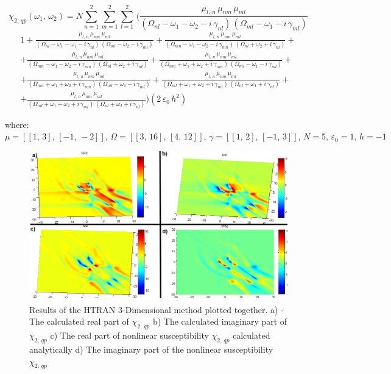 \documentclass[12pt,twoside,a4paper]{article}
\numberwithin{equation}{subsection}
\numberwithin{figure}{subsection}
\begin{document}
\begin{equation}
  {\chi_{2, \,qp}}({\omega_{1}}, \,{\omega_{2}})=N \sum_{n=1}^{2} \sum_{m=1}^{2} \sum_{l=1}^{2}\,(
    \frac {{\mu_{l, \,n}}\,{\mu_{ nm}}\,{\mu_{ml}}}
      {({\Omega_{nl}} - \omega_1 - \omega_2 - i\,{\gamma_{nl}})\,({\Omega_{ml}} - \omega_1 - i\,{\gamma_{ml}})}
\end{equation}
\begin{alignat*}{1} 
  + \frac {{\mu_{l, \,n}}\,{\mu_{nm}}\,{\mu_{ml}}}
      {({\Omega_{nl}} - \omega_1 - \omega_1 - i\,{\gamma_{nl}})\,({\Omega_{ml}} - \omega_2 - i\,{\gamma_{ml}})} 
  + \frac {{\mu_{l, \,n}}\,{\mu_{nm}} \,{\mu_{ml}}}
      {({\Omega_{mn}} - \omega_1 - \omega_2 - i\,{\gamma_{mn}})\,({\Omega_{nl}} + \omega_2 + i\,{\gamma_{nl}})} 
+\\ + \frac {{\mu_{l, \,n}}\,{\mu_{nm}}\,{\mu_{ml}}}
      {({\Omega_{mn}} - \omega_1 - \omega_2 - i\,{\gamma_{mn}})\,({\Omega_{nl}} + \omega_2 + i\,{\gamma_{nl}})} 
  + \frac {{\mu_{l, \,n}}\,{\mu_{nm}}\,{\mu_{ml}}}
      {({\Omega_{nm}} + \omega_1 + \omega_2 + i\,{\gamma_{nm}})\,({\Omega_{ml}} - \omega_1 - i\,{\gamma_{ml}})} 
+\\ + \frac {{\mu_{l, \,n}}\,{\mu_{nm}}\,{\mu_{ml}}}
      {({\Omega_{nm}} + \omega_1 + \omega_2 + i\,{\gamma_{nm}})\,({\Omega_{ml}} - \omega_1 - i\,{\gamma_{ml}})} 
  + \frac {{\mu_{l, \,n}}\,{\mu_{nm}}\,{\mu_{ml}}}
      {({\Omega_{ml}} + \omega_1 + \omega_2 + i\,{\gamma_{ml}})\,({\Omega_{nl}} + \omega_1 + i\,{\gamma_{nl}})} 
+\\ + \frac {{\mu_{l, \,n}}\,{\mu_{nm}}\,{\mu_{ml}}}
      {({\Omega_{ml}} + \omega_1 + \omega_2 + i\,{\gamma_{ml}})\,({\Omega_{nl}} + \omega_2 + i\,{\gamma_{nl}})})  
      (2\,{ \varepsilon_{0}}\,h^{2})
\end{alignat*}

where: 
$\mu=[[1,\,3],\,[-1,\,-2]],\,\Omega=[[3,\,16],\,[4,\,12]],\,\gamma=[[1,\,2],\,[-1,\,3]],\,N=5,\,\varepsilon_{0}=1,\,h=-1$

 

\begin{figure}
  \includegraphics[width=150mm]{img/htran_qp_3d.png}
  \caption{Results of the HTRAN 3-Dimensional method plotted together.  
     a) - The calculated real part of ${\chi_{2, \,qp}}$ 
     b) The calculated imaginary part of ${\chi_{2, \,qp}}$ 
     c) The real part of nonlinear susceptibility ${\chi_{2, \,qp}}$ calculated analytically 
     d) The imaginary part of the nonlinear susceptibility ${\chi_{2, \,qp}}$
     \label{fig:htran_qp_3d}}
\end{figure}
\end{document}
